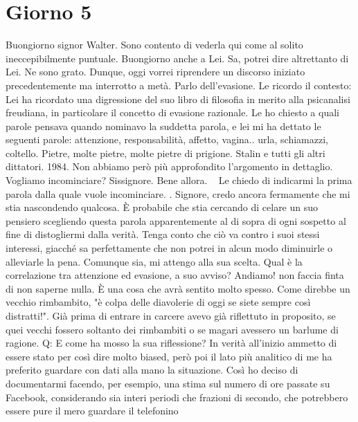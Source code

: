 \documentclass[a4paper,12pt]{article}
\newcommand{\Walter}{\speak{W}}
\newcommand{\Pollazzi}{\speak{P}}
\begin{document}
\section*{Giorno 5}
\begin{dialogue}
 \Pollazzi Buongiorno signor Walter. Sono contento di vederla qui come al solito ineccepibilmente puntuale.
\Walter  Buongiorno anche a Lei. Sa, potrei dire altrettanto di Lei.
\Pollazzi Ne sono grato. Dunque, oggi vorrei riprendere un discorso iniziato precedentemente ma interrotto a metà. Parlo dell'evasione. Le ricordo il contesto: Lei ha ricordato una digressione del suo libro di filosofia in merito alla psicanalisi freudiana, in particolare il concetto di evasione razionale. Le ho chiesto a quali parole pensava quando nominavo la suddetta parola, e lei mi ha dettato le seguenti parole:  attenzione, responsabilità, affetto, vagina.. urla, schiamazzi, coltello. Pietre, molte pietre, molte pietre di prigione. Stalin e tutti gli altri dittatori. 1984. Non abbiamo però più approfondito l'argomento in dettaglio. Vogliamo incominciare?
\Walter  Sissignore.
\Pollazzi Bene allora.   Le chiedo di indicarmi la prima parola dalla quale vuole incominciare. . Signore, credo ancora fermamente che mi stia nascondendo qualcosa. È probabile che stia cercando di celare un suo pensiero scegliendo questa parola apparentemente al di sopra di ogni sospetto al fine di distogliermi dalla verità. Tenga conto che ciò va contro i suoi stessi interessi, giacché sa perfettamente che non potrei in alcun modo diminuirle o alleviarle la pena. Comunque sia, mi attengo alla sua scelta. Qual è la correlazione tra attenzione ed evasione, a suo avviso?
\Walter  Andiamo! non faccia finta di non saperne nulla. È una cosa che avrà sentito molto spesso. Come direbbe un vecchio rimbambito, "è colpa delle diavolerie di oggi se siete sempre così distratti!". Già prima di entrare in carcere avevo già riflettuto in proposito, se quei vecchi fossero soltanto dei rimbambiti o se magari avessero un barlume di ragione.
Q: E come ha mosso la sua riflessione?
\Walter  In verità all'inizio ammetto di essere stato per così dire molto
biased, però poi il lato più analitico di me ha preferito guardare con dati alla
mano la situazione. Così ho deciso di documentarmi facendo, per esempio, una
stima sul numero di ore passate su Facebook, considerando sia interi periodi che
frazioni di secondo, che potrebbero essere pure il mero guardare il telefonino

\end{dialogue}
\end{document}
